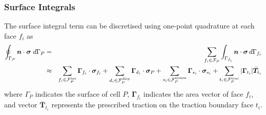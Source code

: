 \documentclass[sn-mathphys,Numbered]{sn-jnl}%
\newcommand{\bb}{\boldsymbol}
\begin{document}
\subsubsection{Surface Integrals}
The surface integral term can be discretised using one-point quadrature at each face $f_i$ as
\begin{eqnarray} \label{eq:divStressDiscret}
	\oint_{\Gamma_P} \bb{n} \cdot \bb{\sigma}  \; d\Gamma_P
	&=& \sum_{f_i \in \mathcal{F}_P} \int_{\Gamma_{f_i}} \bb{n} \cdot \bb{\sigma}  \,  d \Gamma_{f_i} \notag \\
	&\approx&
	\sum_{f_i \in \mathcal{F}_P^{\text{int}}} \bb{\Gamma}_{f_i} \cdot \bb{\sigma}_{f_i}
	+ \sum_{d_i \in \mathcal{F}_P^{\text{disp}}} \bb{\Gamma}_{d_i} \cdot \bb{\sigma}_{P}
	+ \sum_{s_i \in \mathcal{F}_P^{\text{symm}}} \bb{\Gamma}_{s_i} \cdot \bb{\sigma}_{s_i}
	+ \sum_{t_i \in \mathcal{F}_P^{\text{trac}}} |\bb{\Gamma}_{t_i}| \bar{\bb{T}}_{t_i}
\end{eqnarray}
where $\Gamma_P$ indicates the surface of cell $P$, $\bb{\Gamma}_{f_i}$ indicates the area vector of face $f_i$, and vector $\bar{\bb{T}}_{t_i}$ represents the prescribed traction on the traction boundary face $t_i$.
\end{document}
